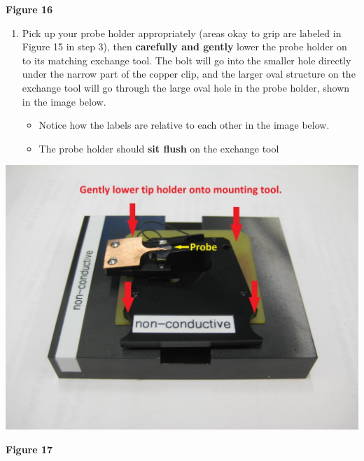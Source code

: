 \documentclass{../lab}
\begin{document}
\textbf{Figure 16}

\begin{enumerate}
    \item Pick up your probe holder appropriately (areas okay to grip are labeled in Figure 15 in step 3), then \textbf{carefully and gently} lower the probe holder on to its matching exchange tool.  The bolt will go into the smaller hole directly under the narrow part of the copper clip, and the larger oval structure on the exchange tool will go through the large oval hole in the probe holder, shown in the image below.
    \begin{itemize}
        \item Notice how the labels are relative to each other in the image below.

        \item The probe holder should \textbf{sit flush} on the exchange tool

    \end{itemize}

\end{enumerate}


\begin{center}
    \href{http://experimentationlab.berkeley.edu/sites/default/files/AFMImages/17.JPG}{\includegraphics[width=0.5\linewidth]{images/17.JPG}}
\end{center}

\textbf{Figure 17}
\end{document}
